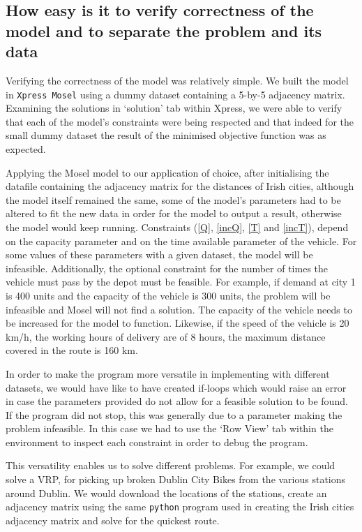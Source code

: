 \documentclass[a4paper,11pt]{article}
\begin{document}
\subsection{How easy is it to verify correctness of the model and to separate the problem and its data}
Verifying the correctness of the model was relatively simple. We built the model in \texttt{Xpress Mosel} using a dummy dataset containing a 5-by-5 adjacency matrix. Examining the solutions in `solution' tab within Xpress, we were able to verify that each of the model's constraints were being respected and that indeed for the small dummy dataset the result of the minimised objective function was as expected.

 Applying the Mosel model to our application of choice, after initialising the datafile containing the adjacency matrix for the distances of Irish cities, although the model itself remained the same, some of the model's parameters had to be altered to fit the new data in order for the model to output a result, otherwise the model would keep running. Constraints (\ref{Q}, \ref{incQ}, \ref{T} and \ref{incT}), depend on the capacity parameter and on the time available parameter of the vehicle. For some values of these parameters with a given dataset, the model will be infeasible. Additionally, the optional constraint for the number of times the vehicle must pass by the depot must be feasible. For example, if demand at city 1 is 400 units and the capacity of the vehicle is 300 units, the problem will be infeasible and Mosel will not find a solution. The capacity of the vehicle needs to be increased for the model to function. Likewise, if the speed of the vehicle is 20 km/h, the working hours of delivery are of 8 hours, the maximum distance covered in the route is 160 km.
 
In order to make the program more versatile in implementing with different datasets, we would have like to have created if-loops which would raise an error in case the parameters provided do not allow for a feasible solution to be found. If the program did not stop, this was generally due to a parameter making the problem infeasible. In this case we had to use the `Row View' tab within the environment to inspect each constraint in order to debug the program.

This versatility enables us to solve different problems. For example, we could solve a VRP, for picking up broken Dublin City Bikes from the various stations around Dublin. We would download the locations of the stations, create an adjacency matrix using the same \texttt{python} program used in creating the Irish cities adjacency matrix and solve for the quickest route. 
\end{document}
